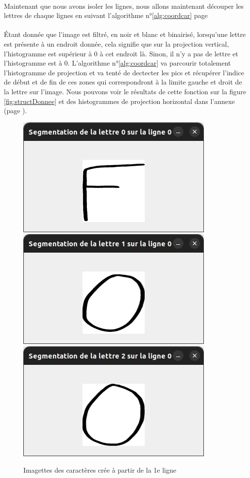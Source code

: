 \documentclass[a4paper]{article}
\begin{document}
			\paragraph{} Maintenant que nous avons isoler les lignes, nous allons maintenant découper les lettres de chaque lignes en suivant l'algorithme n°\ref{alg:coordcar} page \pageref{alg:coordcar}
			\paragraph{} Étant donnée que l'image est filtré, en noir et blanc et binairisé, lorsqu'une lettre est présente à un endroit donnée, cela signifie que sur la projection vertical, l'histogramme est supérieur à 0 à cet endroit là. Sinon, il n'y a pas de lettre et l'histogramme est à 0. L'algorithme n°\ref{alg:coordcar} va parcourir totalement l'histogramme de projection et va tenté de dectecter les pics et récupérer l'indice de début et de fin de ces zones qui correspondront à la limite gauche et droit de la lettre sur l'image. Nous pouvons voir le résultats de cette fonction sur la figure \ref{fig:structDonnee} et des histogrammes de projection horizontal dans l'annexe (page \pageref{fig:histoX1}).
			\begin{figure}
				\caption{Imagettes des caractères crée à partir de la 1e ligne}
				\includegraphics[scale=.3]{segmentation_F.png}
				\centering
				\includegraphics[scale=.3]{segmentation_O1.png}
				\centering
				\includegraphics[scale=.3]{segmentation_O2.png}
				\centering
			\end{figure}
\end{document}
